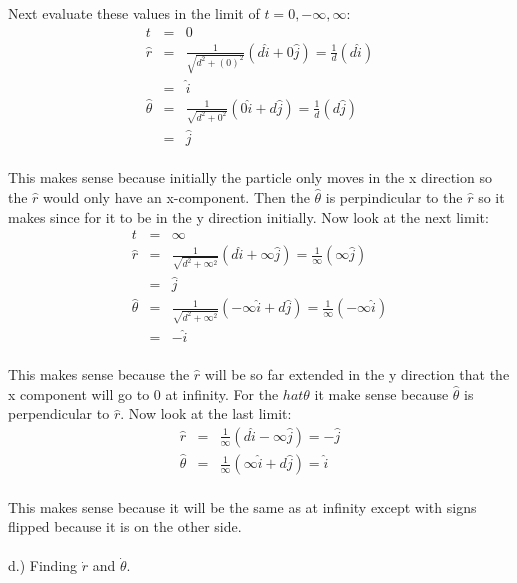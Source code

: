\documentclass[11pt]{amsart}
\begin{document}
Next evaluate these values in the limit of $t=0,-\infty,\infty$: \\
\begin{eqnarray*}
t &=& 0 \\
\hat{r} &=& \frac{1}{\sqrt{d^{2}+(0)^{2}}}(d\hat{i}+0\hat{j}) = \frac{1}{d}(d\hat{i}) \\
&=& \hat{i} \\
\hat{\theta} &=& \frac{1}{\sqrt{d^{2}+0^{2}}}(0\hat{i}+d\hat{j}) = \frac{1}{d}(d\hat{j}) \\
&=& \hat{j} 
\end{eqnarray*} \\
This makes sense because initially the particle only moves in the x direction so the $\hat{r}$ would only have an x-component. Then the $\hat{\theta}$ is perpindicular to the $\hat{r}$ so it makes since for it to be in the y direction initially. Now look at the next limit: \\ 
\begin{eqnarray*}
t &=& \infty \\
\hat{r} &=& \frac{1}{\sqrt{d^{2}+\infty^{2}}}(d\hat{i}+\infty\hat{j}) = \frac{1}{\infty}(\infty\hat{j}) \\
&=& \hat{j} \\
\hat{\theta} &=& \frac{1}{\sqrt{d^{2}+\infty^{2}}}(-\infty\hat{i}+d\hat{j}) = \frac{1}{\infty}(-\infty\hat{i}) \\
&=& -\hat{i} 
\end{eqnarray*}  \\
This makes sense because the $\hat{r}$ will be so far extended in the y direction that the x component will go to 0 at infinity. For the $hat{\theta}$ it make sense because $\hat{\theta}$ is perpendicular to $\hat{r}$.  Now look at the last limit: \\
\begin{eqnarray*} 
\hat{r} &=& \frac{1}{\infty}(d\hat{i}-\infty\hat{j}) = -\hat{j} \\
\hat{\theta} &=& \frac{1}{\infty}(\infty\hat{i}+d\hat{j}) = \hat{i} 
\end{eqnarray*} \\
This makes sense because it will be the same as at infinity except with signs flipped because it is on the other side.\\ \\
d.) Finding $\dot{r}$ and $\dot{\theta}$. \\
\end{document}
